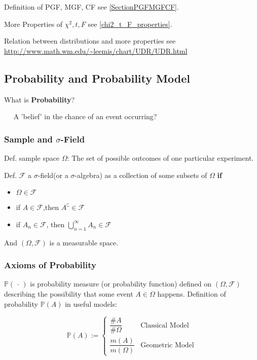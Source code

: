     Definition of PGF, MGF, CF see \autoref{SectionPGFMGFCF}.

    More Properties of $\chi^2,t,F$ see {\autoref{chi2_t_F_properties}}.

    Relation between distributions and more properties see \url{http://www.math.wm.edu/~leemis/chart/UDR/UDR.html}

\subsection{Probability and Probability Model}

    What is \textbf{Probability}? 
    
    $\quad$ A 'belief' in the chance of an event occurring?


\subsubsection{Sample and $\sigma$-Field}
    Def. sample space $\Omega$: The set of  possible outcomes of one particular experiment.

    Def. $\mathscr{F}$ a $\sigma$-field(or a $\sigma$-algebra) as a collection of some subsets of $\Omega$ \textbf{if}
    \begin{itemize}[topsep=2pt,itemsep=0pt]
        \item $\Omega\in\mathscr{F}$
        \item if $A\in\mathscr{F}$,then $A^\complement \in\mathscr{F}$
        \item if $A_n\in\mathscr{F}$, then ${\displaystyle\bigcup_{n=1}^\infty} A_n\in\mathscr{F}$
    \end{itemize}

    And $(\Omega,\mathscr{F})$ is a measurable space.
    

    
\subsubsection{Axioms of Probability}

    $\mathbb{P}(\,\cdot\,)$ is probability measure (or probability function) defined on $(\Omega,\mathscr{F})$ describing the possibility that some event $ A\in\Omega  $ happens. Definition of probability $ \mathbb{P}(A) $ in useful models:
    
    \[
        \mathbb{P}\left( A \right) :=\begin{cases}
            \dfrac{\#A}{\#\Omega }&\text{Classical Model}\\
            \dfrac{m(A)}{m(\Omega )}&\text{Geometric Model}
        \end{cases} 
    \]
    

